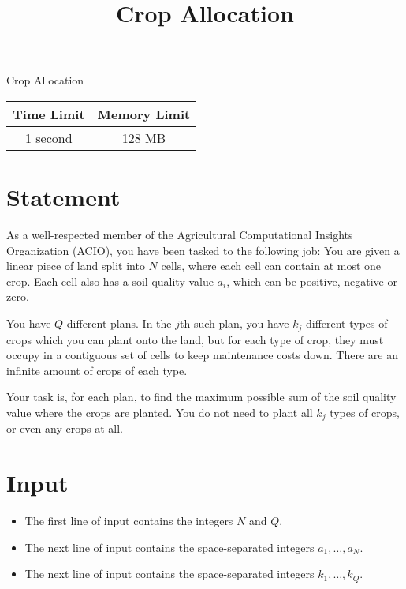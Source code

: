 \documentclass{article}
\begin{document}
\title{\vspace{-5ex}Crop Allocation}
\author{\vspace{-5ex}}
\date{\vspace{-5ex}}
\pagestyle{fancy}
\fancyhf{}

\begin{center}
\huge{Crop Allocation}\small\\
\vspace{5ex}
\begin{tabular}{|c|c|} 
\hline
Time Limit & Memory Limit \\
\hline
1 second & 128 MB \\

\hline
\end{tabular}
\end{center}
\section*{Statement}

As a well-respected member of the Agricultural Computational Insights Organization (ACIO), you have
been tasked to the following job: You are given a linear piece of land split into $N$ cells, where each cell
can contain at most one crop. Each cell also has a soil quality value $a_i$, which can be positive, negative or
zero.

You have $Q$ different plans. In the $j$th such plan, you have $k_j$ different types of crops which you can plant onto the land, but for each type of
crop, they must occupy in a contiguous set of cells to keep maintenance costs down. There are an infinite amount of crops of each type.

Your task is, for each plan, to find the maximum possible sum of the soil
quality value where the crops are planted. You do not need to plant all $k_j$ types of crops, or even any
crops at all.

\section*{Input}

\begin{itemize}
\item The first line of input contains the integers $N$ and $Q$.
\item The next line of input contains the space-separated integers $a_1, \dots, a_N$.
\item The next line of input contains the space-separated integers $k_1, \dots, k_Q$.
\end{itemize}
\end{document}
